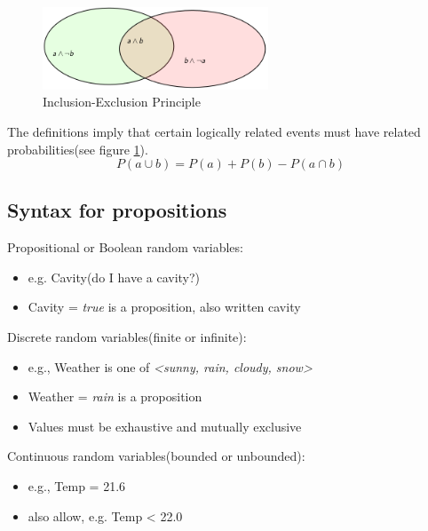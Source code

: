 \begin{figure}[h]\label{inclusion_exclusion_principle}
\centering
\includegraphics[width=0.6\textwidth]{chap2_pics/inclusion_exclusion.png} 
\caption{Inclusion-Exclusion Principle}
\end{figure}

The definitions imply that certain logically related events must have related probabilities(see figure \ref{inclusion_exclusion_principle}).\\
\begin{equation}
P(a \cup b) = P(a) + P(b) - P(a \cap b)
\end{equation}

\subsection{Syntax for propositions}
Propositional or Boolean random variables:\\
\begin{itemize}
\item e.g. Cavity(do I have a cavity?)
\item Cavity = \textit{true} is a proposition, also written cavity 
\end{itemize}
Discrete random variables(finite or infinite):\\
\begin{itemize}
\item e.g., Weather is one of \textit{<sunny, rain, cloudy, snow>}
\item Weather = \textit{rain} is a proposition
\item Values must be exhaustive and mutually exclusive
\end{itemize}
Continuous random variables(bounded or unbounded):\\
\begin{itemize}
\item e.g., Temp = 21.6
\item also allow, e.g. Temp < 22.0
\end{itemize}

